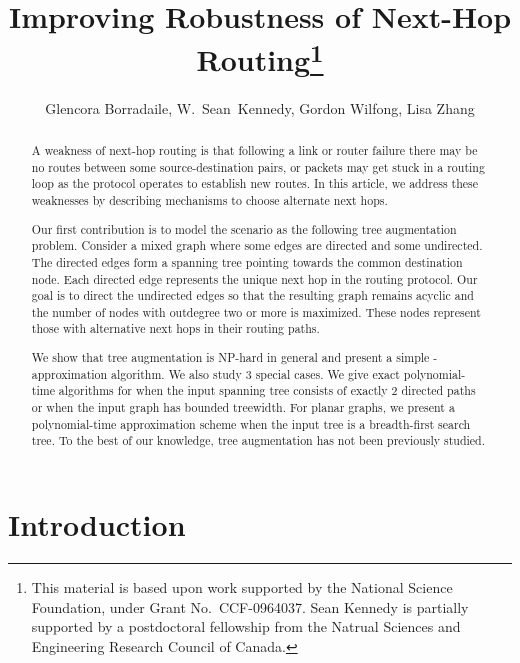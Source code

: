 \documentclass{article}
\begin{document}
\title{Improving Robustness of Next-Hop Routing\thanks{This material is based upon work supported by the National Science
  Foundation, under Grant No.\ CCF-0964037.  Sean Kennedy is partially supported by a postdoctoral fellowship from the Natrual Sciences and Engineering Research Council of Canada.}}

\author{
Glencora Borradaile, W.~Sean~Kennedy, Gordon Wilfong, Lisa Zhang
}




\maketitle




\begin{abstract}
A weakness of next-hop routing is that following a link or router failure there may be no routes between some source-destination pairs, or packets may get stuck in a routing loop as the protocol operates to establish new routes.
In this article, we address these weaknesses by describing mechanisms to choose alternate next hops.

Our first contribution is to model the scenario as the following {\sc tree
augmentation} problem.  Consider a mixed graph where some edges are
directed and some undirected.  The directed edges form a spanning tree
pointing towards the common destination node. Each directed edge
represents the unique next hop in the routing protocol.  Our goal is
to direct the undirected edges so that the resulting graph remains
acyclic and the number of nodes with outdegree two or more is
maximized.  These nodes represent those with alternative next hops
in their routing paths.

We show that {\sc tree augmentation} is NP-hard in general and present
a simple -approximation algorithm.  We also study 3 special
cases.  We give exact polynomial-time algorithms for when the input spanning tree consists of exactly 2 directed
paths or when the input graph has bounded treewidth.  For planar graphs, we present a
polynomial-time approximation scheme when the input tree is a
breadth-first search tree. To the best of our knowledge, {\sc tree
  augmentation} has not been previously studied.

\end{abstract}

\section{Introduction}
\end{document}
